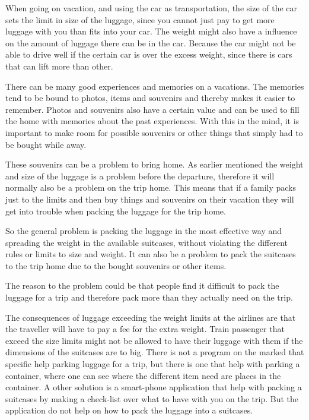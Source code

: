 When going on vacation, and using the car as transportation, the size of the car sets the limit in size of the luggage, since you cannot just pay to get more luggage with you than fits into your car. The weight might also have a influence on the amount of luggage there can be in the car. Because the car might not be able to drive well if the certain car is over the excess weight, since there is cars that can lift more than other. %

There can be many good experiences and memories on a vacations. The memories tend to be bound to photos, items and souvenirs and thereby makes it easier to remember. Photos and souvenirs also have a certain value and can be used to fill the home with memories about the past experiences.
With this in the mind, it is important to make room for possible souvenirs or other things that simply had to be bought while away.

These souvenirs can be a problem to bring home. As earlier mentioned the weight and size of the luggage is a problem before the departure, therefore it will normally also be a problem on the trip home.
This means that if a family packs just to the limits and then buy things and souvenirs on their vacation they will get into trouble when packing the luggage for the trip home.

So the general problem is packing the luggage in the most effective way and spreading the weight in the available suitcases, without violating the different rules or limits to size and weight. It can also be a problem to pack the suitcases to the trip home due to the bought souvenirs or other items.

The reason to the problem could be that people find it difficult to pack the luggage for a trip and therefore pack more than they actually need on the trip.

The consequences of luggage exceeding the weight limits at the airlines are that the traveller will have to pay a fee for the extra weight.
Train passenger that exceed the size limits might not be allowed to have their luggage with them if the dimensions of the suitcases are to big.
There is not a program on the marked that specific help parking luggage for a trip, but there is one that help with parking a container\citep{solvingmaze}, where one can see where the different item need are places in the container. A other solution is a smart-phone application\citep{ipack} that help with packing a suitcases by making a check-list over what to have with you on the trip. But the application do not help on how to pack the luggage into a suitcases.